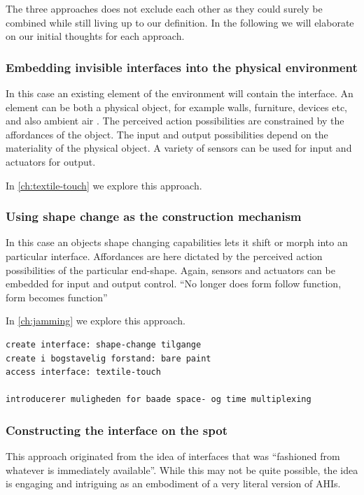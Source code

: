 The three approaches does not exclude each other as they could surely be combined while still living up to our definition.
In the following we will elaborate on our initial thoughts for each approach.

\subsubsection{Embedding invisible interfaces into the physical environment}

In this case an existing element of the environment will contain the interface.
An element can be both a physical object, for example walls, furniture, devices etc, and also ambient air .
The perceived action possibilities are constrained by the affordances of the object. 
The input and output possibilities depend on the materiality of the physical object.
A variety of sensors can be used for input and actuators for output.

In \autoref{ch:textile-touch} we explore this approach.

\subsubsection{Using shape change as the construction mechanism}

In this case an objects shape changing capabilities lets it shift or morph into an particular interface.
Affordances are here dictated by the perceived action possibilities of the particular end-shape.
Again, sensors and actuators can be embedded for input and output control.
``No longer does form follow function, form becomes function''

In \autoref{ch:jamming} we explore this approach.

\begin{verbatim}
create interface: shape-change tilgange
create i bogstavelig forstand: bare paint
access interface: textile-touch

introducerer muligheden for baade space- og time multiplexing
\end{verbatim}

\subsubsection{Constructing the interface on the spot}
This approach originated from the idea of interfaces that was ``fashioned from whatever is immediately available''.
While this may not be quite possible, the idea is engaging and intriguing as an embodiment of a very literal version of AHIs.

